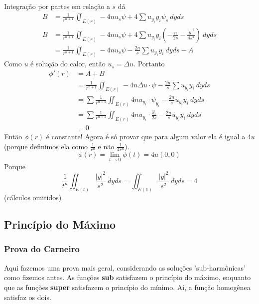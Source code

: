 \documentclass[11pt]{article}
\begin{document}
Integração por partes em relação a \(s\) dá\begin{align*}
	B&=\frac{1}{r^{n+1}} \iint_{E(r)} -4nu_s\psi + 4\sum u_{y_i} y_i \psi_s\ dyds\\
	B&=\frac{1}{r^{n+1}} \iint_{E(r)} -4nu_s\psi + 4\sum u_{y_i} y_i \left(-\frac{n}{2s}-\frac{|y|^2}{4s^2}\right)\ dyds\\
	&=\frac{1}{r^{n+1}} \iint_{E(r)} -4nu_s\psi -\frac{2n}{s}\sum u_{y_i}y_i\ dy ds - A 
\end{align*}
Como \(u\) é solução do calor, então \(u_s = \Delta u\). Portanto \begin{align*}
	\phi'(r) &= A + B \\
	&=\frac{1}{r^{n+1}} \iint_{E(r)} -4n\Delta u\cdot \psi - \frac{2n}{s}\sum u_{y_i}y_i\ dyds\\
	&=\sum \frac{1}{r^{n+1}} \iint_{E(r)} 4n u_{y_i}\cdot \psi_{y_i} - \frac{2n}{s} u_{y_i}y_i\ dyds\\
	&=\sum \frac{1}{r^{n+1}} \iint_{E(r)} 4n u_{y_i}\cdot \frac{y_i}{2s} - \frac{2n}{s} u_{y_i}y_i\ dyds \\
	&=0
\end{align*}
Então \(\phi(r)\) é constante! Agora é só provar que para algum valor ela é igual a \(4u\) (porque definimos ela como \( \frac{1}{r^{n}} \) e não \( \frac{1}{4r^n} \)).
\[\phi(r) = \lim_{t\rightarrow 0}\phi(t) = 4u(0,0)\]
Porque \[\frac{1}{t^n}\iint_{E(t)}\frac{|y|^2}{s^2}\ dyds = \iint_{E(1)} \frac{|y|^2}{s^2}\ dy ds = 4\] (cálculos omitidos)


\subsection{Princípio do Máximo}
\subsubsection*{Prova do Carneiro}

Aqui fazemos uma prova mais geral, considerando as soluções 'sub-harmônicas' como fizemos antes. As funções \textbf{sub} satisfazem o princípio do máximo, enquanto que as funções \textbf{super} satisfazem o princípio do mínimo. Aí, a função homogênea satisfaz os dois.
\end{document}
